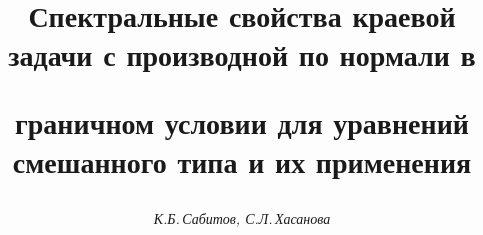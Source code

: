 




%





\newcommand{\sgn}{\operatorname{sgn}}


\newcommand{\re}{\operatorname{Re}}


\newcommand{\const}{\operatorname{const}}


\newcommand{\tg}{\operatorname{tg}}


\newcommand{\tts}[1]{}









\setcounter{page}{64}















\author{\it К.Б.\,Сабитов, С.Л.\,Хасанова}




\title{Спектральные свойства краевой задачи с производной по нормали в 


граничном условии для уравнений смешанного типа и их применения}





\date{}




\pagestyle{plain} %







